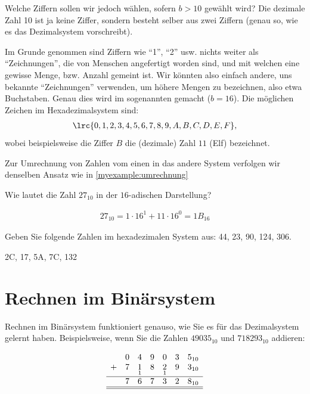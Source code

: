 Welche Ziffern sollen wir jedoch wählen, sofern $b>10$ gewählt wird? Die dezimale Zahl 10 ist ja keine Ziffer, sondern besteht selber aus zwei Ziffern (genau so, wie es das Dezimalsystem vorschreibt).

Im Grunde genommen sind Ziffern wie \enquote{1}, \enquote{2} usw. nichts weiter als \enquote{Zeichnungen}, die von Menschen angefertigt worden sind, und mit welchen eine gewisse Menge, bzw. Anzahl gemeint ist. Wir könnten also einfach andere, uns bekannte \enquote{Zeichnungen} verwenden, um höhere Mengen zu bezeichnen, also etwa Buchstaben. Genau dies wird im sogenannten  gemacht ($b=16$). Die möglichen Zeichen im Hexadezimalsystem sind:
\begin{align*}
	\lrc{0,1,2,3,4,5,6,7,8,9,A,B,C,D,E,F},
\end{align*}
wobei beispielsweise die Ziffer $B$ die (dezimale) Zahl $11$ (Elf) bezeichnet.

Zur Umrechnung von Zahlen vom einen in das andere System verfolgen wir denselben Ansatz wie in \cref{myexample:umrechnung}

\begin{myexercise}
	Wie lautet die Zahl $27_{10}$ in der $16$-adischen Darstellung?
	\begin{myanswer}
		\begin{align*}
			27_{10} = 1\cdot 16^1 + 11\cdot 16^0 = 1B_{16}
		\end{align*}
	\end{myanswer}
\end{myexercise}

\begin{myexercise}
	Geben Sie folgende Zahlen im hexadezimalen System aus: 44, 23, 90, 124, 306.
	\begin{myanswer}
		2C, 17, 5A, 7C, 132
	\end{myanswer}
\end{myexercise}


\section{Rechnen im Binärsystem}

Rechnen im Binärsystem funktioniert genauso, wie Sie es für das Dezimalsystem gelernt haben. Beispielsweise, wenn Sie die Zahlen $49035_{10}$ und $718293_{10}$ addieren:

\[
	\begin{array}{ccccccc}
		  & 0              & 4               & 9              & 0               & 3              & 5_{10}              \\
		+ & \underset{}{7} & \underset{1}{1} & \underset{}{8} & \underset{1}{2} & \underset{}{9} & \underset{}{3_{10}} \\
		\hline
		  & 7              & 6               & 7              & 3               & 2              & 8_{10}              \\\hline\hline
	\end{array}
\]


